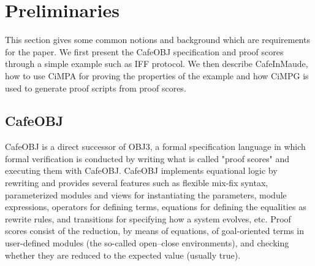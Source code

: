 \documentclass[a4paper,fleqn]{cas-dc}
\begin{document}

\section{Preliminaries}\label{pre}
This section gives some common notions and background which are requirements for the paper. We first present the CafeOBJ specification and proof scores through a simple example such as IFF protocol. We then describe CafeInMaude, how to use CiMPA for proving the properties of the example and how CiMPG is used to generate proof scripts from proof scores.

\subsection{CafeOBJ} \label{cafeobj}
CafeOBJ \cite{DiaconescuF98amast} is a direct successor of OBJ3, a formal specification language in which formal verification is conducted by writing what is called "proof scores" \cite{OgataF03fmoods} and executing them with CafeOBJ. CafeOBJ implements equational logic by rewriting and provides several features such as flexible mix-fix syntax, parameterized modules and views for instantiating the parameters, module expressions, operators for defining terms, equations for defining the equalities as rewrite rules, and transitions for specifying how a system evolves, etc. Proof scores consist of the reduction, by means of equations, of goal-oriented terms in user-defined modules (the so-called open–close environments), and checking whether they are reduced to the expected value (usually true). 
\end{document}
